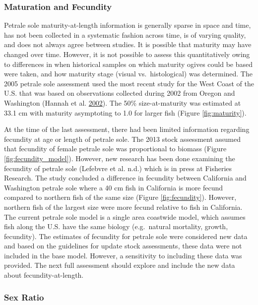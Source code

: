 \documentclass[12pt,]{article}
\begin{document}
\subsubsection{Maturation and Fecundity}\label{maturation-and-fecundity}

Petrale sole maturity-at-length information is generally sparse in space
and time, has not been collected in a systematic fashion across time, is
of varying quality, and does not always agree between studies. It is
possible that maturity may have changed over time. However, it is not
possible to assess this quantitatively owing to differences in when
historical samples on which maturity ogives could be based were taken,
and how maturity stage (visual vs.~histological) was determined. The
2005 petrale sole assessment used the most recent study for the West
Coast of the U.S. that was based on observations collected during 2002
from Oregon and Washington (Hannah et al.
\protect\hyperlink{ref-hannah_length_2002}{2002}). The 50\%
size-at-maturity was estimated at 33.1 cm with maturity asymptoting to
1.0 for larger fish (Figure \ref{fig:maturity}).

At the time of the last assessment, there had been limited information
regarding fecundity at age or length of petrale sole. The 2013 stock
assessment assumed that fecundity of female petrale sole was
proportional to biomass (Figure \ref{fig:fecundity_model}). However, new
research has been done examining the fecundity of petrale sole (Lefebvre
et al. n.d.) which is in press at Fisheries Research. The study
concluded a difference in fecundity between California and Washington
petrale sole where a 40 cm fish in California is more fecund compared to
northern fish of the same size (Figure \ref{fig:fecundity}). However,
northern fish of the largest size were more fecund relative to fish in
California. The current petrale sole model is a single area coastwide
model, which assumes fish along the U.S. have the same biology
(e.g.~natural mortality, growth, fecundity). The estimates of fecundity
for petrale sole were considered new data and based on the guidelines
for update stock assessments, these data were not included in the base
model. However, a sensitivity to including these data was provided. The
next full assessment should explore and include the new data about
fecundity-at-length.

\subsubsection{Sex Ratio}\label{sex-ratio}
\end{document}

